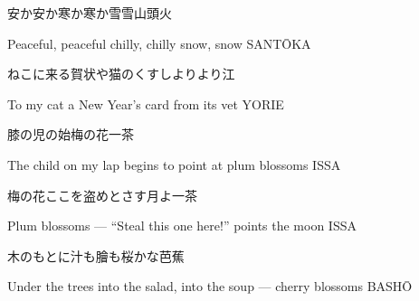 \begin{haiku}
    {\FH 安か安か寒か寒か雪雪}\hfill{\FH 山頭火}

    \vin{} Peaceful, peaceful
    \vin{} \vin{} chilly, chilly
    \vin{} \vin{} \vin{} snow, snow \hspace{\fill} SANT\={O}KA
\end{haiku}

\begin{haiku}
    {\FH ねこに来る賀状や猫のくすしより}\hfill{\FH より江}

    \vin{} To my cat
    \vin{} \vin{} a New Year's card
    \vin{} \vin{} \vin{} from its vet \hspace{\fill} YORIE
\end{haiku}

\begin{haiku}
    {\FH 膝の児の始梅の花}\hfill{\FH 一茶}

    \vin{} The child on my lap
    \vin{} \vin{} begins to point at
    \vin{} \vin{} \vin{} plum blossoms \hspace{\fill} ISSA
\end{haiku}

\begin{haiku}
    {\FH 梅の花ここを盗めとさす月よ}\hfill{\FH 一茶}

    \vin{} Plum blossoms ---
    \vin{} \vin{} ``Steal this one here!''
    \vin{} \vin{} \vin{} points the moon \hspace{\fill} ISSA
\end{haiku}

\begin{haiku}
    {\FH 木のもとに汁も膾も桜かな}\hfill{\FH 芭蕉}

    \vin{} Under the trees
    \vin{} \vin{} into the salad, into the soup ---
    \vin{} \vin{} \vin{} cherry blossoms \hspace{\fill} BASH\={O}
\end{haiku}
